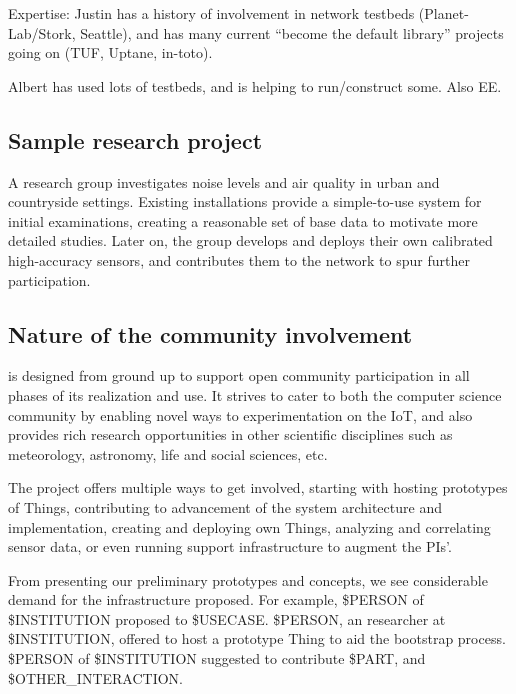Expertise: Justin has a history of involvement in network testbeds
(Planet-Lab/Stork, Seattle), and has many current ``become the default
library'' projects going on (TUF, Uptane, in-toto).

Albert has used lots of testbeds, and is helping to run/construct some.
Also EE.


\subsection{Sample research project}

A research group investigates noise levels and air quality in
urban and countryside settings. Existing \sysname installations
provide a simple-to-use system for initial examinations, creating
a reasonable set of base data to motivate more detailed studies.
Later on, the group develops and deploys their own calibrated
high-accuracy sensors, and contributes them to the \sysname network
to spur further participation.



\subsection{Nature of the community involvement}

\sysname is designed from ground up to support open community
participation in all phases of its realization and use.
It strives to cater to both the computer science community
by enabling novel ways to experimentation on the \acrlong{IoT},
and also provides rich research opportunities in other
scientific disciplines such as meteorology, astronomy, life and
social sciences, etc.

The project offers multiple ways to get involved, starting with
hosting prototypes of Things, contributing to advancement of the
system architecture and implementation, creating and deploying
own Things, analyzing and correlating sensor data, or even
running \sysname support infrastructure to augment the PIs'.

From presenting our preliminary prototypes and concepts,
we see considerable demand for the infrastructure proposed.
For example, \$PERSON of \$INSTITUTION proposed to \$USECASE.
\$PERSON, an researcher at \$INSTITUTION, offered to host
a prototype Thing to aid the bootstrap process.
\$PERSON of \$INSTITUTION suggested to contribute
\$PART, and \$OTHER\_INTERACTION.


